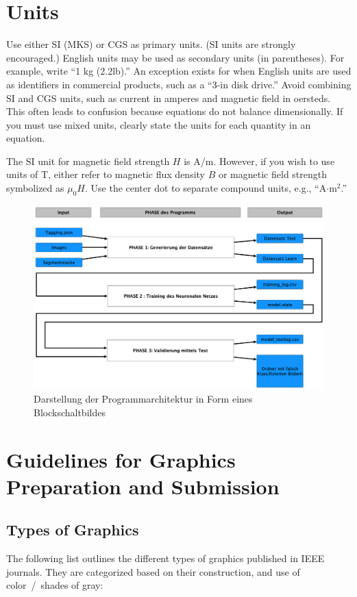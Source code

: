 \documentclass[journal,twoside,web]{ieeecolor}
\begin{document}
\section{Units}
Use either SI (MKS) or CGS as primary units. (SI units are strongly 
encouraged.) English units may be used as secondary units (in parentheses). 
For example, write ``1 kg (2.2lb).'' An exception exists for when 
English units are used as identifiers in commercial products, such as a ``3\textonehalf-in 
disk drive.'' Avoid combining SI and CGS units, such as current in amperes 
and magnetic field in oersteds. This often leads to confusion because 
equations do not balance dimensionally. If you must use mixed units, clearly 
state the units for each quantity in an equation.

The SI unit for magnetic field strength $H$ is A/m. However, if you wish to use 
units of T, either refer to magnetic flux density $B$ or magnetic field 
strength symbolized as $\mu _{0}H$. Use the center dot to separate 
compound units, e.g., ``A$\cdot $m$^{2}$.''

\begin{figure}[!t]
\centerline{\includegraphics[width=\columnwidth]{Architektur.png}}
\caption{Darstellung der Programmarchitektur in Form eines Blockschaltbildes}
\label{fig1}
\end{figure}


\section{Guidelines for Graphics Preparation and Submission}
\label{sec:guidelines}

\subsection{Types of Graphics}
The following list outlines the different types of graphics published in 
IEEE journals. They are categorized based on their construction, and use of 
color~/~shades of gray:
\end{document}
